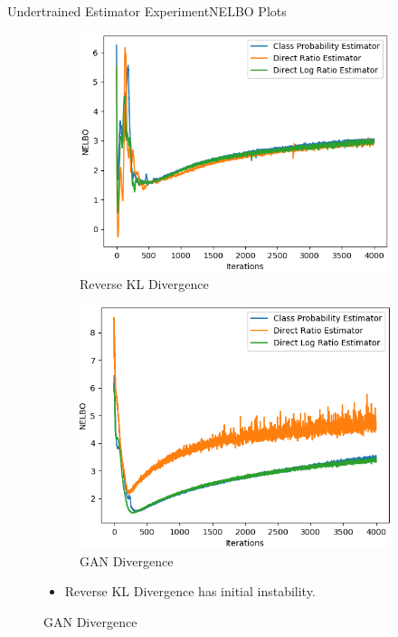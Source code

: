 \documentclass[handout]{beamer}
\begin{document}
\begin{frame}{Undertrained Estimator Experiment}{NELBO Plots}
\begin{figure}
\begin{subfigure}{0.49\textwidth}
\includegraphics[width=\linewidth]{part2nelbos/JCKLDvsJCKLexpvsJCKLgudlog.png}
\caption{Reverse KL Divergence}
\end{subfigure}
\begin{subfigure}{0.49\textwidth}
\includegraphics[width=\linewidth]{part2nelbos/JCADVvsJCADVexpvsJCADVgudlog.png}
\caption{GAN Divergence}
\end{subfigure}
\begin{itemize}
\vspace{0.3cm}
\item Reverse KL Divergence has initial instability.
\end{itemize}
\end{figure}
\end{frame}
\end{document}
